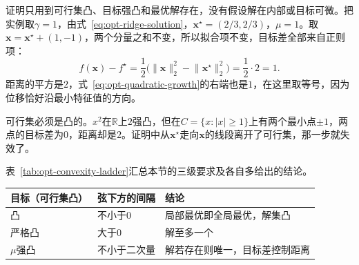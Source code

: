 证明只用到可行集凸、目标强凸和最优解存在，没有假设解在内部或目标可微。把实例取$\gamma=1$，由式~\eqref{eq:opt-ridge-solution}，$\bm{x}^\star=(2/3,2/3)$，$\mu=1$。取$\bm{x}=\bm{x}^\star+(1,-1)$，两个分量之和不变，所以拟合项不变，目标差全部来自正则项：
\[
 f(\bm{x})-f^\star=\frac12\bigl(\lVert\bm{x}\rVert_2^2-\lVert\bm{x}^\star\rVert_2^2\bigr)=\frac12\cdot2=1.
\]
距离的平方是$2$，式~\eqref{eq:opt-quadratic-growth}的右端也是$1$，在这里取等号，因为位移恰好沿最小特征值的方向。

可行集必须是凸的。$x^2$在$\mathbb{R}$上$2$强凸，但在$C=\{x:\lvert x\rvert\geq1\}$上有两个最小点$\pm1$，两点的目标差为$0$，距离却是$2$。证明中从$\bm{x}^\star$走向$\bm{x}$的线段离开了可行集，那一步就失效了。

表~\ref{tab:opt-convexity-ladder}汇总本节的三级要求及各自多给出的结论。

\begin{BookInlineTable}
  \centering
  \begin{tabular}{@{}lll@{}}
    \toprule
    目标（可行集凸） & 弦下方的间隔 & 结论\\
    \midrule
    凸 & 不小于$0$ & 局部最优即全局最优，解集凸\\
    严格凸 & 大于$0$ & 解至多一个\\
    $\mu$强凸 & 不小于二次量 & 解若存在则唯一，目标差控制距离\\
    \bottomrule
  \end{tabular}
  \caption{沿线段比较的三级要求。每一级都比上一级强，存在性仍需另外保证。}
  \label{tab:opt-convexity-ladder}
\end{BookInlineTable}
